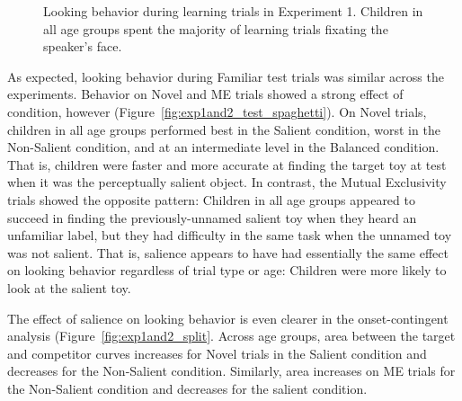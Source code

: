 \documentclass[man,floatsintext]{apa6}
\begin{document}
\begin{figure}[tb]
	\caption{\label{fig:exp1and2_train_spaghetti} Looking behavior during learning trials in Experiment 1. Children in all age groups spent the majority of learning trials fixating the speaker's face.}
\end{figure}


As expected, looking behavior during Familiar test trials was similar across the experiments. Behavior on Novel and ME trials showed a strong effect of condition, however (Figure~\ref{fig:exp1and2_test_spaghetti}). On Novel trials, children in all age groups performed best in the Salient condition, worst in the Non-Salient condition, and at an intermediate level in the Balanced condition. That is, children were faster and more accurate at finding the target toy at test when it was the perceptually salient object. In contrast, the Mutual Exclusivity trials showed the opposite pattern: Children in all age groups appeared to succeed in finding the previously-unnamed salient toy when they heard an unfamiliar label, but they had difficulty in the same task when the unnamed toy was not salient. That is, salience appears to have had essentially the same effect on looking behavior regardless of trial type or age: Children were more likely to look at the salient toy.

The effect of salience on looking behavior is even clearer in the onset-contingent analysis (Figure~\ref{fig:exp1and2_split}. Across age groups, area between the target and competitor curves increases for Novel trials in the Salient condition and decreases for the Non-Salient condition. Similarly, area increases on ME trials for the Non-Salient condition and decreases for the salient condition. 
\end{document}
